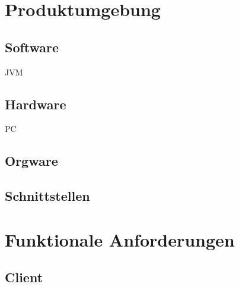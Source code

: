 \documentclass[a4paper,10pt]{article}
\begin{document}
\section{Produktumgebung}
\subsection{Software}
JVM
\subsection{Hardware}
PC
\subsection{Orgware}
\subsection{Schnittstellen}
\section{Funktionale Anforderungen}
\subsection{Client}
\end{document}
